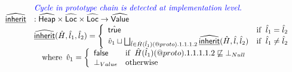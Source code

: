 \[\begin{array}{ll}
& {\color{blue} \textit{Cycle in prototype chain is detected at implementation level.}} \\
\widehat{\underline{\sf inherit}} & : \widehat{\mbox{\textsf{Heap}}} \times \widehat{\mbox{\textsf{Loc}}} \times \widehat{\mbox{\textsf{Loc}}} \rightarrow \widehat{\mbox{\textsf{Value}}} \\
& \widehat{\underline{\sf inherit}}(\hat{H},\hat{l}_1,\hat{l}_2)
  = \left\{
    \begin{array}{ll}
      \hat{\mbox{\textsf{true}}} & {\rm if}\begin{array}[t]{l}\hat{l}_1 = \hat{l}_2\end{array} \\
      \hat{v}_1 \sqcup \bigsqcup_{\hat{l}\in \hat{H}(\hat{l}_1)(@proto).1.1.1.2} \widehat{\underline{\sf inherit}}(\hat{H},\hat{l},\hat{l}_2) & {\rm if}\begin{array}[t]{l}\hat{l}_1 \neq \hat{l}_2\end{array} \\
    \end{array}
  \right.\\
& \quad{\rm where}\begin{array}[t]{l}
  \hat{v}_1 =
    \left\{
    \begin{array}{ll}
      \hat{\mbox{\textsf{false}}} & {\rm if}\begin{array}[t]{l}\hat{H}(\hat{l}_1)(@proto).1.1.1.1.2 \not\sqsubseteq \bot_{Null}\end{array}\\
      \bot_{Value} & {\rm otherwise}\\
    \end{array}
    \right.
  \end{array}\\
\\
\end{array}
\]
